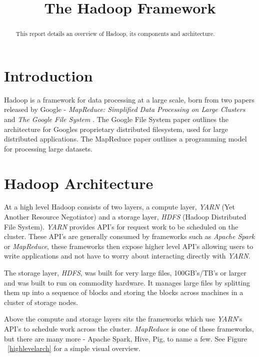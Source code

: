 \documentclass[conference]{IEEEtran}
\begin{document}
\title{The Hadoop Framework}

\author{
}

\maketitle
\suppressfloats

\begin{abstract}
This report details an overview of Hadoop, its components and architecture.
\end{abstract}

\IEEEpeerreviewmaketitle



\section{Introduction}
Hadoop is a framework for data processing at a large scale, born from two papers 
released by Google - \emph{MapReduce: Simplified Data Processing on Large Clusters} \cite{mapreduce} and \emph{The Google File System} \cite{gfs}. 
The Google File System paper outlines the architecture for Googles proprietary distributed filesystem, used for large distributed applications. 
The MapReduce paper outlines a programming model for processing large datasets.

\section{Hadoop Architecture}
At a high level Hadoop consists of two layers, a compute layer, \emph{YARN} (Yet Another Resource Negotiator) and a storage layer, \emph{HDFS} (Hadoop Distributed File System). \emph{YARN} provides API's for request work to be scheduled on the cluster. These API's are generally consumed by frameworks such as \emph{Apache Spark} or \emph{MapReduce}, these frameworks then expose higher level API's allowing users to write applications and not have to worry about interacting directly with \emph{YARN}.

The storage layer, \emph{HDFS}, was built for very large files, 100GB's/TB's or larger and was built to run on commodity hardware. It manages large files by splitting them up into a sequence of blocks and storing the blocks across machines in a cluster of storage nodes.

Above the compute and storage layers sits the frameworks which use \emph{YARN}'s API's to schedule work across the cluster. \emph{MapReduce} is one of these frameworks, but there are many more - Apache Spark, Hive, Pig, to name a few. See Figure ~\ref{highlevelarch} for a simple visual overview.
\end{document}

